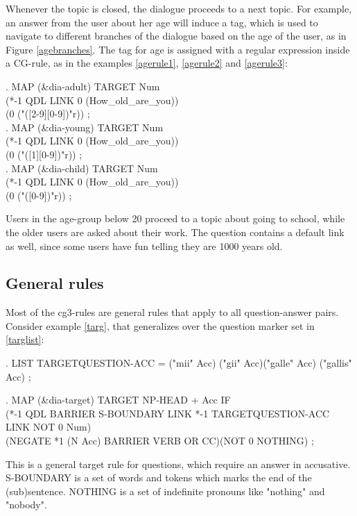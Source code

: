 \documentclass[11pt]{article}
\begin{document}
Whenever the topic is closed, the dialogue proceeds to a next topic. For example, an answer from the user about her age will induce a tag, which is used to navigate to different branches of the dialogue based on the age of the user, as in Figure \ref{agebranches}. The tag for age is assigned with a regular expression inside a CG-rule, as in the examples \ref{agerule1}, \ref{agerule2} and \ref{agerule3}: 

\ex.\flushleft\label{agerule1}  \small{MAP (\&dia-adult) TARGET Num \\(*-1 QDL LINK 0 (How\_old\_are\_you)) \\ (0 ("([2-9][0-9])"r)) ;} \\

\ex.\flushleft\label{agerule2} \small{MAP (\&dia-young) TARGET Num \\(*-1 QDL LINK 0 (How\_old\_are\_you))\\ (0 ("([1][0-9])"r)) ;} \\

\ex.\flushleft\label{agerule3} \small{MAP (\&dia-child) TARGET Num \\(*-1 QDL LINK 0 (How\_old\_are\_you)) \\(0 ("([0-9])"r)) ;} 

Users in the age-group below 20 proceed to a topic about going to school, while the older users are asked about their work. The question contains a  default link as well, since some users have fun telling they are 1000 years old.

\subsection{General rules} 
Most of the cg3-rules are general rules that apply to all question-answer pairs. Consider example \ref{targ},  that generalizes over the question marker set in \ref{targlist}:

\ex.\flushleft\label{targlist} \small{LIST TARGETQUESTION-ACC = ("mii" Acc) ("gii" Acc)("galle" Acc) ("gallis" Acc) ;}

\ex.\flushleft\label{targ} \small{MAP (\&dia-target) TARGET NP-HEAD + Acc IF \\
(*-1 QDL BARRIER S-BOUNDARY LINK *-1 TARGETQUESTION-ACC LINK NOT 0 Num)\\
(NEGATE *1 (N Acc) BARRIER VERB OR CC)(NOT 0 NOTHING) ;}

This is a general target rule for questions, which require an answer in accusative. S-BOUNDARY is a set of words and tokens which marks the end of the (sub)sentence. NOTHING is a set of indefinite pronouns like "nothing" and "nobody". 
\end{document}
